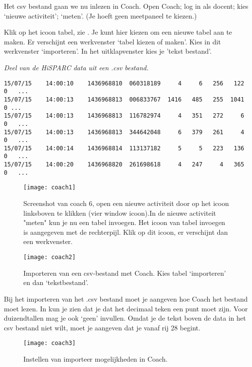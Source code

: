 Het csv bestand gaan we nu inlezen in Coach. Open Coach; log in als docent; kies `nieuwe activiteit'; 
`meten'. (Je hoeft geen meetpaneel te kiezen.)

Klik op het icoon tabel, zie . Je kunt hier kiezen om een
nieuwe tabel aan te maken. Er verschijnt een werkvenster `tabel kiezen of maken'.
Kies in dit werkvenster `importeren'. In het uitklapvenster kies je 'tekst bestand'.

\textit{Deel van de HiSPARC data uit een .csv bestand.}
\begin{verbatim}
15/07/15	14:00:10	1436968810	060318189     4	    6	256	  122	0	...	
15/07/15	14:00:13	1436968813	006833767  1416	  485	255	 1041 0 ...
15/07/15	14:00:13	1436968813	116782974     4	  351	272	    6	0	...
15/07/15	14:00:13	1436968813	344642048     6	  379	261	    4	0	...	
15/07/15	14:00:14	1436968814	113137182     5	    5	223	  136	0	...	
15/07/15	14:00:20	1436968820	261698618     4	  247	  4	  365	0	...
\end{verbatim}

\begin{figure}
    \centering
    \texttt{[image: coach1]}
    \caption{Screenshot van coach 6, open een nieuwe activiteit door op 
    het icoon linksboven te klikken (vier window icoon).In de nieuwe activiteit 
    "meten" kun je nu een tabel invoegen. Het icoon van tabel invoegen is 
    aangegeven met de rechterpijl. Klik op dit icoon, er verschijnt dan een werkvenster.}
    \label{fig:coach1}
\end{figure}

\begin{figure}
    \centering
    \texttt{[image: coach2]}
    \caption{Importeren van een csv-bestand met Coach. Kies tabel `importeren' en
    dan `tekstbestand'.}
    \label{fig:coach2}
\end{figure}

Bij het importeren van het .csv bestand moet je aangeven hoe Coach het bestand moet 
lezen. In  kun je zien dat je dat het decimaal teken
een punt moet zijn. Voor duizendtallen mag je ook `geen' invullen. Omdat je de tekst
boven de data in het csv bestand niet wilt, moet je aangeven dat je vanaf rij 
28 begint.

\begin{figure}
    \centering
    \texttt{[image: coach3]}
    \caption{Instellen van importeer mogelijkheden in Coach.}
    \label{fig:coach3}
\end{figure}
   
